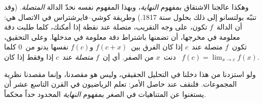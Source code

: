 \documentclass[../../../include/open-logic-section]{subfiles}
\begin{document}
وهكذا عالجنا الاشتقاق بمفهوم \emph{النهاية}، وبهذا المفهوم نفسه نحدّ
الدالة \emph{المتصلة}. (وقد تنبّه بولتسانو إلى ذلك بحلول سنة 1817.)
وطريقة كوشي--فايرشتراس في الاتصال هي: أن الدالة~$f$ تكون، على وجه
التقريب، متصلة عند نقطة إذا أمكنك، كلما طلبت دقة معلومة في مخرجها، أن
تضمنها باشتراط دقة معلومة في مدخلها. وعلى التحقيق، تكون~$f$ متصلة عند~$c$
إذا كان الفرق بين~$f(c + x)$ و$f(c)$ نفسها يدنو من~$0$ كلما دنت~$x$ من
الصفر. أي إن~$f$ \emph{متصلة} عند~$c$ إذا وفقط إذا كان
~$f(c) = \lim_{x \rightarrow c} f(x)$.

ولو استزدنا من هذا دخلنا في التحليل الحقيقي، وليس هو مقصدنا، وإنما مقصدنا
نظرية المجموعات. فلنقف عند حاصل الأمر: تعلم الرياضيون في القرن التاسع
عشر أن يستغنوا عن المتناهيات في الصغر بمفهوم \emph{النهاية} المحدود حداً
محكماً.
\end{document}
